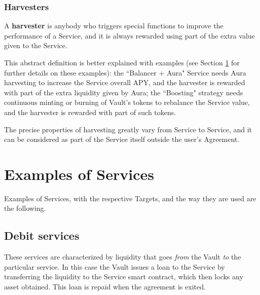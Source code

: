 \documentclass[a4paper,10 pt]{article}
\theoremstyle{definition}
\begin{document}
\subsubsection{Harvesters}\label{harvesterSubSub}
A {\bf harvester} is anybody who triggers special functions to improve the performance of a Service, and it is always rewarded using part of the extra value given to the Service. 

This abstract definition is better explained with examples (see Section \ref{servicesSec} for further details on these examples): the ``Balancer + Aura" Service needs Aura harvesting to increase the Service overall APY, and the harvester is rewarded with part of the extra liquidity given by Aura; the ``Boosting" strategy needs continuous minting or burning of Vault's tokens to rebalance the Service value, and the harvester is rewarded with part of such tokens.

The precise properties of harvesting greatly vary from Service to Service, and it can be considered as part of the Service itself outside the user's Agreement.

\section{Examples of Services}\label{servicesSec}

Examples of Services, with the respective Targets, and the way they are used are the following.

\subsection{Debit services}
These services are characterized by liquidity that goes {\it from} the Vault {\it to} the particular service. In this case the Vault issues a loan to the Service by transferring the liquidity to the Service smart contract, which then locks any asset obtained. This loan is repaid when the agreement is exited.
\end{document}
